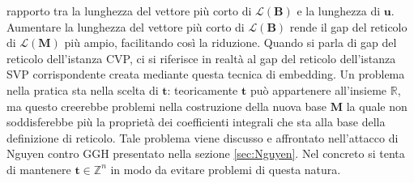 rapporto tra la lunghezza del vettore più corto di $\mathcal{L}(\mathbf{B})$ e la lunghezza 
di $\mathbf{u}$. Aumentare la lunghezza del vettore più corto di 
$\mathcal{L}(\mathbf{B})$ rende il gap del reticolo di $\mathcal{L}(\mathbf{M})$ più ampio, 
facilitando così la riduzione. Quando si parla di gap del reticolo dell'istanza CVP, 
ci si riferisce in realtà al gap del reticolo dell'istanza SVP corrispondente creata 
mediante questa tecnica di embedding.
Un problema nella pratica sta nella scelta di $\mathbf{t}$: teoricamente
$\mathbf{t}$ può appartenere all'insieme $\mathbb{R}$, ma questo creerebbe problemi nella
costruzione della nuova base $\mathbf{M}$ la quale non soddisferebbe più la proprietà dei 
coefficienti integrali che sta alla base della definizione di reticolo. Tale problema viene
discusso e affrontato nell'attacco di Nguyen contro GGH presentato nella sezione \ref{sec:Nguyen}.
Nel concreto si tenta di mantenere $\mathbf{t} \in \mathbb{Z}^n$ in modo da evitare problemi
di questa natura.

